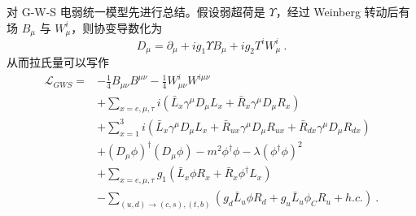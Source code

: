 
\begin{issues}
\issueMissDepend
\end{issues}

对 G-W-S 电弱统一模型先进行总结。假设弱超荷是 $\Upsilon$，经过 Weinberg 转动后有场 $B_\mu$ 与 $W^i_\mu$，则协变导数化为 
\begin{equation}
D_\mu = \partial_\mu + i g_1 \Upsilon B_\mu + i g_2 T^i W_\mu^i~.
\end{equation}
从而拉氏量可以写作 
\begin{equation}
	\begin{aligned}
		\mathcal L_{GWS} =& -\frac{1}{4} B_{\mu\nu} B^{\mu\nu} - \frac{1}{4} W_{\mu\nu}^i W^{i\mu\nu}\\
		&+ \sum_{x = e, \mu, \tau} i \left(\bar{L}_x \gamma^\mu D_\mu L_x + \bar{R}_x \gamma^\mu D_\mu R_x\right)\\
		&+ \sum_{x=1}^3 i \left(\bar{L}_{x} \gamma^\mu D_\mu L_x + \bar{R}_{ux} \gamma^\mu D_\mu R_{ux} + \bar{R}_{dx} \gamma^\mu D_\mu R_{dx}\right) \\
		&+(D_\mu \phi)^\dagger (D_\mu \phi) - m^2 \phi^\dagger \phi - \lambda (\phi^\dagger \phi)^2 \\
		&+ \sum_{x = e, \mu, \tau} g_1 \left(\bar{L}_x \phi R_x + \bar{R}_x \phi^\dagger L_x\right) \\
		&- \sum_{(u, d) \to (c, s), (t, b)} \left(g_d \bar{L}_u \phi R_d + g_u \bar{L}_u \phi_C R_u + h.c.\right) ~.
	\end{aligned}
\end{equation}

